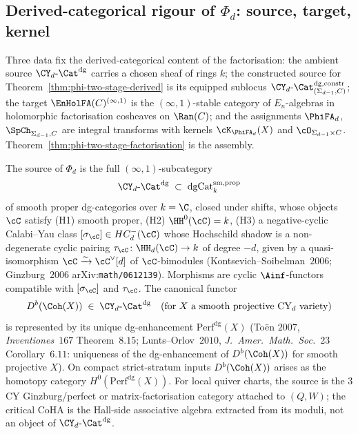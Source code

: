 \subsection{Derived-categorical rigour of \texorpdfstring{$\Phi_d$}{Phi-d}: source, target, kernel}
\label{subsec:phi-d-derived-rigour}

Three data fix the derived-categorical content of the factorisation: the ambient source $\CY_d\text{-}\Cat^{\mathrm{dg}}$ carries a chosen sheaf of rings $k$; the constructed source for Theorem~\ref{thm:phi-two-stage-derived} is its equipped sublocus $\CY_d\text{-}\Cat^{\mathrm{dg,constr}}_{(\Sigma_{d-1},C)}$; the target $\EnHolFA(C)^{(\infty,1)}$ is the $(\infty,1)$-stable category of $E_n$-algebras in holomorphic factorisation cosheaves on $\Ran(C)$; and the assignments $\PhiFA_d$, $\SpCh_{\Sigma_{d-1}, C}$ are integral transforms with kernels $\cK_{\PhiFA_d}(X)$ and $\cO_{\Sigma_{d-1} \times C}$. Theorem~\ref{thm:phi-two-stage-factorisation} is the assembly.

\begin{definition}
\label{def:cy-d-cat-dg}
The source of $\Phi_d$ is the full $(\infty,1)$-subcategory
\[
 \CY_d\text{-}\Cat^{\mathrm{dg}} \;\subset\; \mathrm{dgCat}^{\mathrm{sm,prop}}_k
\]
of smooth proper dg-categories over $k = \C$, closed under shifts, whose objects $\cC$ satisfy \textup{(H1)} smooth proper, \textup{(H2)} $\HH^0(\cC) = k$, \textup{(H3)} a negative-cyclic Calabi--Yau class $[\sigma_\cC]\in HC^-_d(\cC)$ whose Hochschild shadow is a non-degenerate cyclic pairing $\tau_\cC \colon \HH_d(\cC) \to k$ of degree $-d$, given by a quasi-isomorphism $\cC \xrightarrow{\sim} \cC^\vee[d]$ of $\cC$-bimodules (Kontsevich--Soibelman~$2006$; Ginzburg~$2006$ arXiv:\texttt{math/0612139}). Morphisms are cyclic $\Ainf$-functors compatible with $[\sigma_\cC]$ and $\tau_\cC$. The canonical functor
\[
 D^b(\Coh(X)) \;\in\; \CY_d\text{-}\Cat^{\mathrm{dg}} \quad \text{(for $X$ a smooth projective CY$_d$ variety)}
\]
is represented by its unique dg-enhancement $\mathrm{Perf}^{\mathrm{dg}}(X)$ (To\"en $2007$, \textit{Inventiones}~$167$ Theorem~$8.15$; Lunts--Orlov~$2010$, \textit{J.~Amer.~Math.~Soc.}~$23$ Corollary~$6.11$: uniqueness of the dg-enhancement of $D^b(\Coh(X))$ for smooth projective $X$). On compact strict-stratum inputs $D^b(\Coh(X))$ arises as the homotopy category $H^0(\mathrm{Perf}^{\mathrm{dg}}(X))$. For local quiver charts, the source is the $3$CY Ginzburg/perfect or matrix-factorisation category attached to $(Q,W)$; the critical CoHA is the Hall-side associative algebra extracted from its moduli, not an object of $\CY_d\text{-}\Cat^{\mathrm{dg}}$.
\end{definition}


